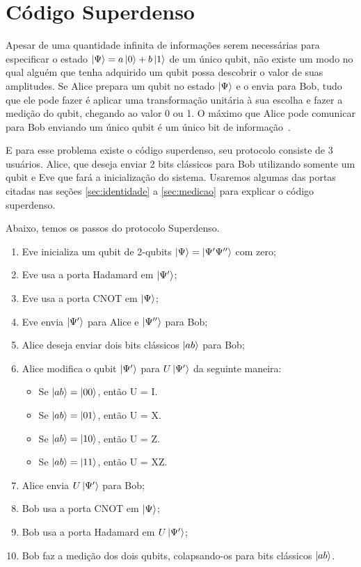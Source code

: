 \documentclass[a4paper, 12pt, oneside]{book}
\begin{document}
\section{Código Superdenso} \label{sec:superdenso}

Apesar de uma quantidade infinita de informações serem necessárias para especificar o estado $\ket{\Psi}=a\ket{0}+b\ket{1}$ de um único qubit, não existe um modo no qual alguém que tenha adquirido um qubit possa descobrir o valor de suas amplitudes. Se Alice prepara um qubit no estado $\ket{\Psi}$ e o envia para Bob, tudo que ele pode fazer é aplicar uma transformação unitária à sua escolha e fazer a medição do qubit, chegando ao valor 0 ou 1. O máximo que Alice pode comunicar para Bob enviando um único qubit é um único bit de informação~\cite{mermin}.

E para esse problema existe o código superdenso, seu protocolo consiste de 3 usuários. Alice, que deseja enviar 2 bits clássicos para Bob utilizando somente um qubit e Eve que fará a inicialização do sistema. Usaremos algumas das portas citadas nas seções \ref{sec:identidade} a \ref{sec:medicao} para explicar o código superdenso.

Abaixo, temos os passos do protocolo Superdenso.
\begin{enumerate}
\item Eve inicializa um qubit de 2-qubits $\ket{\Psi} = \ket{\Psi'\Psi''}$ com zero;
\item Eve usa a porta Hadamard em $\ket{\Psi'}$;
\item Eve usa a porta CNOT em $\ket{\Psi}$;
\item Eve envia $\ket{\Psi'}$ para Alice e $\ket{\Psi''}$ para Bob;
\item Alice deseja enviar dois bits clássicos $\ket{ab}$ para Bob;
\item Alice modifica o qubit $\ket{\Psi'}$ para $U\ket{\Psi'}$ da seguinte maneira:
	\begin{itemize}
	\item Se $\ket{ab}=\ket{00}$, então U = I.
	\item Se $\ket{ab}=\ket{01}$, então U = X.
	\item Se $\ket{ab}=\ket{10}$, então U = Z.
	\item Se $\ket{ab}=\ket{11}$, então U = XZ.
	\end{itemize}
\item Alice envia $U\ket{\Psi'}$ para Bob;
\item Bob usa a porta CNOT em $\ket{\Psi}$;
\item Bob usa a porta Hadamard em $U\ket{\Psi'}$;
\item Bob faz a medição dos dois qubits, colapsando-os para bits clássicos $\ket{ab}$.
\end{enumerate}
\end{document}
